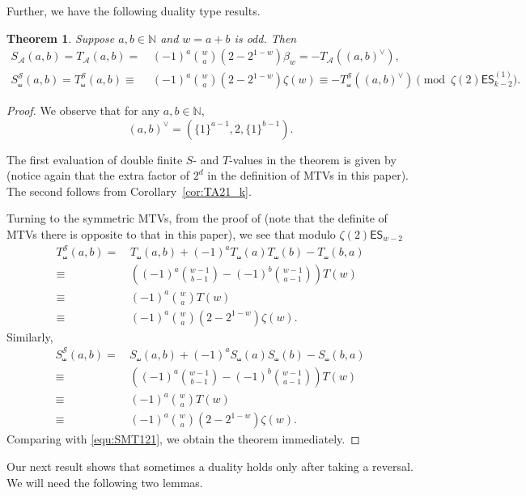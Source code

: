 \documentclass{article}
\newcommand{\ES}{\mathsf {ES}}
\newcommand{\sha}{\shuffle}
\newcommand{\Sy}{{\mathcal S}}
\newcommand{\calA}{\mathcal{A}}
\newcommand{\N}{\mathbb{N}}
\theoremstyle{plain}
\newtheorem{thm}{Theorem}[section]
\theoremstyle{definition}
\begin{document}
Further, we have the following duality type results.

\begin{thm}\label{thm:dblTs}
Suppose $a,b\in\N$ and $w=a+b$ is odd. Then
\begin{align*}
S_\calA(a,b)=T_\calA(a,b)=&\, (-1)^a \binom{w}{a} (2-2^{1-w}) \beta_w =-T_\calA((a,b)^\vee), \\
S_\sha^\Sy(a,b)=T_\sha^\Sy(a,b)\equiv&\,  (-1)^{a}\binom{w}{a}(2-2^{1-w}) \zeta(w)\equiv -T_\sha^\Sy((a,b)^\vee) \pmod{\zeta(2)\ES_{k-2}^{(1)}}.
\end{align*}
\end{thm}
\begin{proof}
We observe that for any $a,b\in\N$,
\begin{equation*}
(a,b)^\vee=(\{1\}^{a-1},2,\{1\}^{b-1}).
\end{equation*}

The first evaluation of double finite $S$- and $T$-values in the theorem is given by \cite[(42)]{Zhao2024a} (notice again that the extra factor of $2^d$ in the definition of MTVs in this paper). The second follows from Corollary~\ref{cor:TA21_k}.

Turning to the symmetric MTVs, from the proof of \cite[Cor. 4.2]{XuZhao2023Oct} (note that the definite
of MTVs there is opposite to that in this paper), we see that modulo $\zeta(2)\ES_{w-2}$
\begin{align*}
T_\sha^\Sy(a,b)=&\, T_\sha(a,b)+(-1)^{a}T_\sha(a)T_\sha(b)-T_\sha(b,a) \\
\equiv &\, \left( (-1)^{a}\binom{w-1}{b-1} -(-1)^{b}\binom{w-1}{a-1}\right) T(w) \\
\equiv  &\, (-1)^{a}\binom{w}{a}T(w)  \\
\equiv  &\, (-1)^{a}\binom{w}{a}(2-2^{1-w}) \zeta(w).
\end{align*}
Similarly,
\begin{align*}
S_\sha^\Sy(a,b)=&\, S_\sha(a,b)+(-1)^{a}S_\sha(a)S_\sha(b)-S_\sha(b,a) \\
\equiv &\, \left( (-1)^{a}\binom{w-1}{b-1} -(-1)^{b}\binom{w-1}{a-1}\right) T(w) \\
\equiv  &\, (-1)^{a}\binom{w}{a}T(w)  \\
\equiv  &\, (-1)^{a}\binom{w}{a}(2-2^{1-w}) \zeta(w).
\end{align*}
Comparing with \eqref{equ:SMT121}, we obtain the theorem immediately.
\end{proof}

Our next result shows that sometimes a duality holds only after taking a reversal. We will need the following two lemmas.
\end{document}
